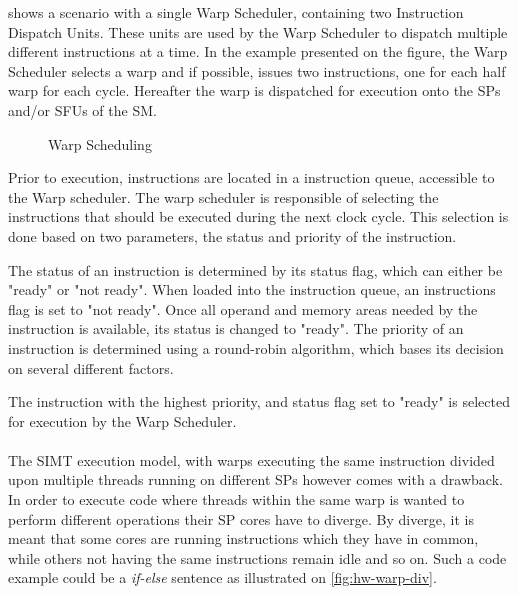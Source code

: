  shows a scenario with a single Warp Scheduler, containing two Instruction Dispatch Units. 
These units are used by the Warp Scheduler to dispatch multiple different instructions at a time.
In the example presented on the figure, the Warp Scheduler selects a warp and if possible, issues two instructions, one for each half warp for each cycle.
Hereafter the warp is dispatched for execution onto the SPs and/or SFUs of the SM.

\begin{figure}[ht]
	\centering
	\caption{Warp Scheduling}
	\label{fig:hw-warp-scheduling}
\end{figure}


Prior to execution, instructions are located in a instruction queue, accessible to the Warp scheduler.
The warp scheduler is responsible of selecting the instructions that should be executed during the next clock cycle.
This selection is done based on two parameters, the status and priority of the instruction.

The status of an instruction is determined by its status flag, which can either be "ready" or "not ready".
When loaded into the instruction queue, an instructions flag is set to "not ready".
Once all operand and memory areas needed by the instruction is available, its status is changed to "ready".
The priority of an instruction is determined using a round-robin algorithm, which bases its decision on several different factors.

The instruction with the highest priority, and status flag set to "ready" is selected for execution by the Warp Scheduler.
\\\\
The SIMT execution model, with warps executing the same instruction divided upon multiple threads running on different SPs however comes with a drawback.
In order to execute code where threads within the same warp is wanted to perform different operations their SP cores have to diverge.
By diverge, it is meant that some cores are running instructions which they have in common, while others not having the same instructions remain idle and so on.
Such a code example could be a \textit{if-else} sentence as illustrated on \cref{fig:hw-warp-div}.
 
